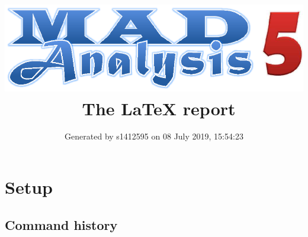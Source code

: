 \documentclass[a4paper, 10pt]{article}
\title{{\includegraphics[scale=.4]{logo.eps}}\ The LaTeX report}
\author{Generated by s1412595 on 08 July 2019, 15:54:23}
\begin{document}
\maketitle
\flushbottom

\newpage
\section{ Setup}

\subsection{ Command history}
\end{document}

